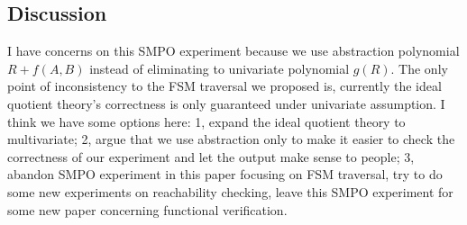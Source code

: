 \subsection{Discussion}

I have concerns on this SMPO experiment because we use abstraction polynomial $R+f(A,B)$ instead of eliminating to univariate polynomial $g(R)$.
The only point of inconsistency to the FSM traversal we proposed is, currently the ideal quotient theory's correctness is only guaranteed under
univariate assumption. I think we have some options here: 1, expand the ideal quotient theory to multivariate; 2, argue that we use abstraction
only to make it easier to check the correctness of our experiment and let the output make sense to people; 3, abandon SMPO experiment in this paper
focusing on FSM traversal, try to do some new experiments on reachability checking, leave this SMPO experiment for some new paper concerning
functional verification.
